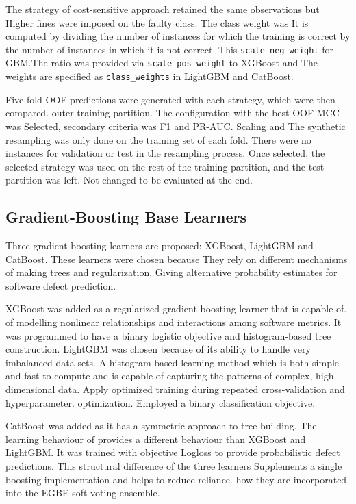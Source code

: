 \documentclass[conference]{IEEEtran}
\begin{document}
The strategy of cost-sensitive approach retained the same observations but
Higher fines were imposed on the faulty class. The class weight was
It is computed by dividing the number of instances for which the training is correct by the number of instances in which it is not correct. This
\texttt{scale\_neg\_weight} for GBM.The ratio was provided via \texttt{scale\_pos\_weight} to XGBoost and
The weights are specified as \texttt{class\_weights} in LightGBM and CatBoost.

Five-fold OOF predictions were generated with each strategy, which were then compared.
outer training partition. The configuration with the best OOF MCC was
Selected, secondary criteria was F1 and PR-AUC. Scaling and
The synthetic resampling was only done on the training set of each
fold. There were no instances for validation or test in the
resampling process. Once selected, the selected strategy was used on
the rest of the training partition, and the test partition was left.
Not changed to be evaluated at the end.


\subsection{Gradient-Boosting Base Learners}
\label{subsec:base-learners}

Three gradient-boosting learners are proposed:
XGBoost, LightGBM and CatBoost. These learners were chosen because
They rely on different mechanisms of making trees and regularization,
Giving alternative probability estimates for software defect
prediction.

XGBoost was added as a regularized gradient boosting learner that is capable of.
of modelling nonlinear relationships and interactions among software
metrics. It was programmed to have a binary logistic objective and
histogram-based tree construction. LightGBM was chosen because of its ability to handle very imbalanced data sets.
A histogram-based learning method which is both simple and fast to compute and is capable of capturing the patterns of complex, high-dimensional data.
Apply optimized training during repeated cross-validation and hyperparameter.
optimization. Employed a binary classification objective.

CatBoost was added as it has a symmetric approach to tree building.
The learning behaviour of provides a different behaviour than XGBoost and LightGBM. It
was trained with objective Logloss to provide probabilistic
defect predictions. This structural difference of the three learners
Supplements a single boosting implementation and helps to reduce reliance.
how they are incorporated into the EGBE soft voting ensemble.
\end{document}
